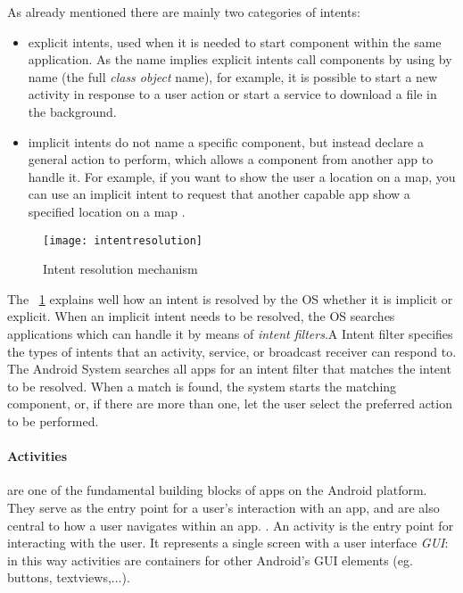 As already mentioned there are mainly two categories of intents:
\begin{itemize}
	\item explicit intents, used when it is needed to start component within the same application. As the name implies explicit intents call components by using by name (the full \textit{class object} name), for example, it is possible to start a new activity in response to a user action or start a service to download a file in the background.
	\item implicit intents do not name a specific component, but instead declare a general action to perform, which allows a component from another app to handle it. For example, if you want to show the user a location on a map, you can use an implicit intent to request that another capable app show a specified location on a map \cite{devandroidintent}.
\end{itemize}

\begin{figure}[h]
	\centering
	\texttt{[image: intentresolution]}
	\caption{Intent resolution mechanism}
	\label{fig:2.4}
\end{figure}

The \figurename~\ref{fig:2.4} explains well how an intent is resolved by the OS whether it is implicit or explicit. When an implicit intent needs to be resolved, the OS searches applications which can handle it by means of \textit{intent filters}.A Intent filter specifies the types of intents that an activity, service, or broadcast receiver can respond to. The Android System searches all apps for an intent filter that matches the intent to be resolved. When a match is found, the system starts the matching component, or, if there are more than one, let the user select the preferred action to be performed.

\paragraph{Activities} are one of the fundamental building blocks of apps on the Android platform. They serve as the entry point for a user's interaction with an app, and are also central to how a user navigates within an app. \cite{devandroidactivity}. An activity is the entry point for interacting with the user. It represents a single screen with a user interface \textit{GUI}: in this way activities are containers for other Android's GUI elements (eg. buttons, textviews,...).


